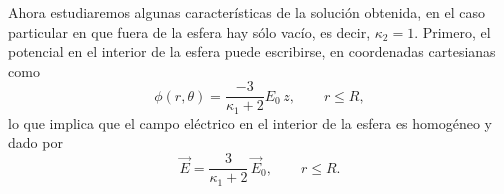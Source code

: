  Ahora estudiaremos algunas características de la solución obtenida, en el caso particular en que fuera de la esfera hay sólo vacío, es decir, $\kappa_2=1$. Primero, el potencial en el interior de la esfera puede escribirse, en coordenadas cartesianas como
 \begin{equation}
\phi(r,\theta)=\frac{-3}{\kappa_1+2}E_0\,z, \qquad r\le R,
\end{equation}
lo que implica que el campo eléctrico en el interior de la esfera es homogéneo y dado por
\begin{equation}
\vec{E}=\frac{3}{\kappa_1+2}\,\vec{E}_0, \qquad r\le R.
\end{equation}

